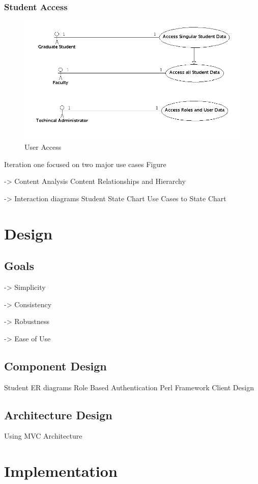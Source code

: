 \documentclass[11pt,a4paper]{report}
\begin{document}
\subsubsection{ Student Access }
\begin{figure}[htp]
\centering
\includegraphics[scale=0.5]{diagrams/use_cases/access_uc.png}
\caption{User Access}
\label{fig:UserAccess}
\end{figure}


Iteration one focused on two major use cases Figure 

-> Content Analysis 
Content Relationships and Hierarchy 

-> Interaction diagrams
	Student State Chart 
	Use Cases to State Chart 

\section{Design}
\subsection{Goals}

-> Simplicity

-> Consistency

-> Robustness

-> Ease of Use

\subsection{Component Design}
Student ER diagrams
Role Based Authentication
Perl Framework 
Client Design 
\subsection{Architecture Design}
Using MVC Architecture 
\section{Implementation}
\end{document}
